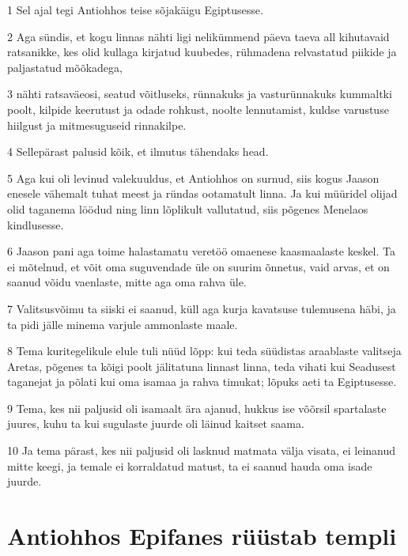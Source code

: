\par 1 Sel ajal tegi Antiohhos teise sõjakäigu Egiptusesse.
\par 2 Aga sündis, et kogu linnas nähti ligi nelikümmend päeva taeva all kihutavaid ratsanikke, kes olid kullaga kirjatud kuubedes, rühmadena relvastatud piikide ja paljastatud mõõkadega,
\par 3 nähti ratsaväeosi, seatud võitluseks, rünnakuks ja vasturünnakuks kummaltki poolt, kilpide keerutust ja odade rohkust, noolte lennutamist, kuldse varustuse hiilgust ja mitmesuguseid rinnakilpe.
\par 4 Sellepärast palusid kõik, et ilmutus tähendaks head.
\par 5 Aga kui oli levinud valekuuldus, et Antiohhos on surnud, siis kogus Jaason enesele vähemalt tuhat meest ja ründas ootamatult linna. Ja kui müüridel olijad olid taganema löödud ning linn lõplikult vallutatud, siis põgenes Menelaos kindlusesse.
\par 6 Jaason pani aga toime halastamatu veretöö omaenese kaasmaalaste keskel. Ta ei mõtelnud, et võit oma suguvendade üle on suurim õnnetus, vaid arvas, et on saanud võidu vaenlaste, mitte aga oma rahva üle.
\par 7 Valitsusvõimu ta siiski ei saanud, küll aga kurja kavatsuse tulemusena häbi, ja ta pidi jälle minema varjule ammonlaste maale.
\par 8 Tema kuritegelikule elule tuli nüüd lõpp: kui teda süüdistas araablaste valitseja Aretas, põgenes ta kõigi poolt jälitatuna linnast linna, teda vihati kui Seadusest taganejat ja põlati kui oma isamaa ja rahva timukat; lõpuks aeti ta Egiptusesse.
\par 9 Tema, kes nii paljusid oli isamaalt ära ajanud, hukkus ise võõrsil spartalaste juures, kuhu ta kui sugulaste juurde oli läinud kaitset saama.
\par 10 Ja tema pärast, kes nii paljusid oli lasknud matmata välja visata, ei leinanud mitte keegi, ja temale ei korraldatud matust, ta ei saanud hauda oma isade juurde.


\section*{Antiohhos Epifanes rüüstab templi}

